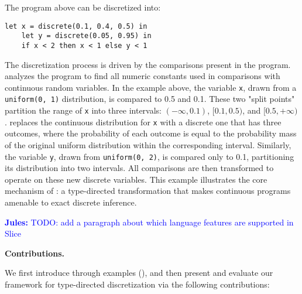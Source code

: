 \documentclass[acmsmall,screen,dvipsnames,x11names,nonacm,anonymous,review]{acmart}
\renewcommand{\paragraph}[1]{\vspace{1em}\noindent\textbf{#1}\ }
\newcommand{\jules}[1]{\textcolor{blue}{\textbf{Jules:} #1}}
\newcommand{\Slice}{\text{\scshape Slice}\xspace}
\begin{document}
\noindent The program above can be discretized into:

\begin{lstlisting}[aboveskip=1em,belowskip=1em]
    let x = discrete(0.1, 0.4, 0.5) in
    let y = discrete(0.05, 0.95) in
    if x < 2 then x < 1 else y < 1
\end{lstlisting}

The discretization process is driven by the comparisons present in the program. \Slice analyzes the program to find all numeric constants used in comparisons with continuous random variables. In the example above, the variable \texttt{x}, drawn from a \texttt{uniform(0, 1)} distribution, is compared to 0.5 and 0.1. These two "split points" partition the range of \texttt{x} into three intervals: $(-\infty, 0.1)$, $[0.1, 0.5)$, and $[0.5, +\infty)$. \Slice replaces the continuous distribution for \texttt{x} with a discrete one that has three outcomes, where the probability of each outcome is equal to the probability mass of the original uniform distribution within the corresponding interval. Similarly, the variable \texttt{y}, drawn from \texttt{uniform(0, 2)}, is compared only to 0.1, partitioning its distribution into two intervals. All comparisons are then transformed to operate on these new discrete variables. This example illustrates the core mechanism of \Slice: a type-directed transformation that makes continuous programs amenable to exact discrete inference.

\jules{TODO: add a paragraph about which language features are supported in Slice}

\paragraph{Contributions.}

We first introduce \Slice through examples (), and then present and evaluate our framework for type-directed discretization via the following contributions:
\end{document}
